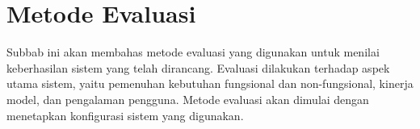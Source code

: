 \section{Metode Evaluasi}
\label{sec:metode-evaluasi} 
Subbab ini akan membahas metode evaluasi yang digunakan untuk menilai keberhasilan sistem yang telah dirancang. Evaluasi dilakukan terhadap aspek utama sistem, yaitu pemenuhan kebutuhan fungsional dan non-fungsional, kinerja model, dan pengalaman pengguna. Metode evaluasi akan dimulai dengan menetapkan konfigurasi sistem yang digunakan.


    




